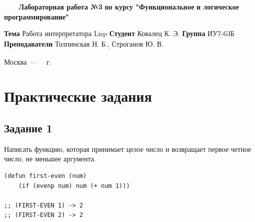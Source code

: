 \documentclass[a4paper,14pt, unknownkeysallowed]{extreport}
\begin{document}
\begin{titlepage}
	
	\begin{center}
		\noindent\begin{minipage}{1.3\textwidth}\centering
		\Large\textbf{   ~~~ Лабораторная работа №3}\newline
		\textbf{по курсу "Функциональное}\newline
		\textbf{и логическое программирование"}\newline\newline\newline
		\end{minipage}
	\end{center}
	
	\noindent\textbf{Тема} 			$\underline{\text{Работа интерпретатора Lisp}}$\newline\newline
	\noindent\textbf{Студент} 		$\underline{\text{Ковалец К. Э.}}$\newline\newline
	\noindent\textbf{Группа} 		$\underline{\text{ИУ7-63Б}}$\newline\newline
	\noindent\textbf{Преподаватели} $\underline{\text{Толпинская Н. Б., Строганов Ю. В.}}$\newline
	
	\begin{center}
		\vfill
		Москва~---~\the\year
		~г.
	\end{center}
	\restoregeometry
\end{titlepage}



\setcounter{page}{2}
\chapter{Практические задания}

\section{Задание 1}

Написать функцию, которая принимает целое число и возвращает первое четное число, не меньшее аргумента.

\begin{center}
\captionsetup{justification=raggedright,singlelinecheck=off}
\begin{lstlisting}[label=lst:parallel_processing,caption=Решение задания 1]
(defun first-even (num)
    (if (evenp num) num (+ num 1)))

;; (FIRST-EVEN 1) -> 2
;; (FIRST-EVEN 2) -> 2
\end{lstlisting}
\end{center}
\end{document}
